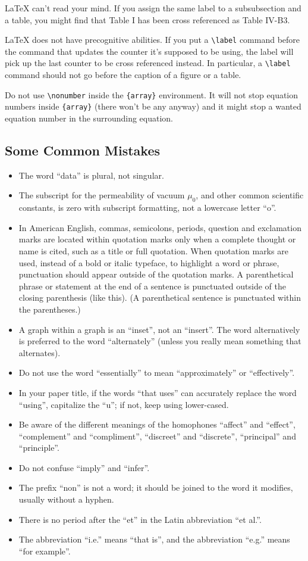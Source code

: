 \documentclass[conference]{IEEEtran}
\begin{document}
    {\LaTeX} can't read your mind. If you assign the same label to a
subsubsection and a table, you might find that Table I has been cross
referenced as Table IV-B3.

{\LaTeX} does not have precognitive abilities. If you put a
\verb|\label| command before the command that updates the counter it's
supposed to be using, the label will pick up the last counter to be
cross referenced instead. In particular, a \verb|\label| command
should not go before the caption of a figure or a table.

Do not use \verb|\nonumber| inside the \verb|{array}| environment. It
will not stop equation numbers inside \verb|{array}| (there won't be
any anyway) and it might stop a wanted equation number in the
surrounding equation.

\subsection{Some Common Mistakes}\label{SCM}
\begin{itemize}
    \item The word ``data'' is plural, not singular.
    \item The subscript for the permeability of vacuum $\mu_{0}$, and other common scientific constants, is zero with subscript formatting, not a lowercase letter ``o''.
    \item In American English, commas, semicolons, periods, question and exclamation marks are located within quotation marks only when a complete thought or name is cited, such as a title or full quotation. When quotation marks are used, instead of a bold or italic typeface, to highlight a word or phrase, punctuation should appear outside of the quotation marks. A parenthetical phrase or statement at the end of a sentence is punctuated outside of the closing parenthesis (like this). (A parenthetical sentence is punctuated within the parentheses.)
    \item A graph within a graph is an ``inset'', not an ``insert''. The word alternatively is preferred to the word ``alternately'' (unless you really mean something that alternates).
    \item Do not use the word ``essentially'' to mean ``approximately'' or ``effectively''.
    \item In your paper title, if the words ``that uses'' can accurately replace the word ``using'', capitalize the ``u''; if not, keep using lower-cased.
    \item Be aware of the different meanings of the homophones ``affect'' and ``effect'', ``complement'' and ``compliment'', ``discreet'' and ``discrete'', ``principal'' and ``principle''.
    \item Do not confuse ``imply'' and ``infer''.
    \item The prefix ``non'' is not a word; it should be joined to the word it modifies, usually without a hyphen.
    \item There is no period after the ``et'' in the Latin abbreviation ``et al.''.
    \item The abbreviation ``i.e.'' means ``that is'', and the abbreviation ``e.g.'' means ``for example''.
\end{itemize}
\end{document}
